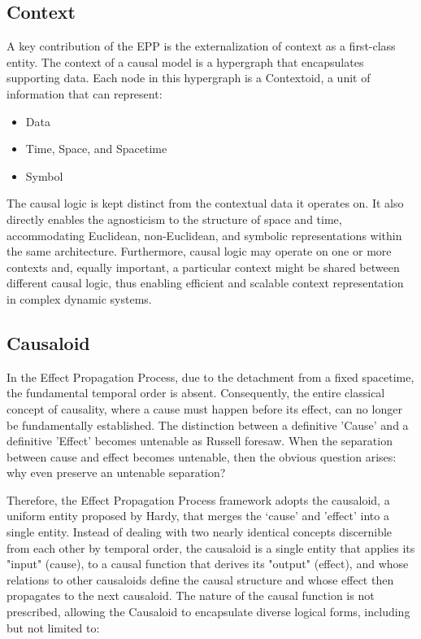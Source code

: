 %
%
\subsection{Context}
\label{sec:epp_context}

A key contribution of the EPP is the externalization of context as a first-class entity.
The context of a causal model is a hypergraph that encapsulates supporting data. 
Each node in this hypergraph is a Contextoid, a unit of information that can represent:

\begin{itemize}
	\item Data
	\item Time, Space, and Spacetime
	\item Symbol 
\end{itemize}

The causal logic is kept distinct from the contextual data it operates on. It also directly enables the  agnosticism to the structure of space and time, accommodating Euclidean, non-Euclidean, and symbolic representations within the same architecture. Furthermore,  causal logic  may operate on one or more contexts and, equally important, a particular context might be shared between different causal logic, thus enabling efficient and scalable context representation in complex dynamic systems. 

\newpage

%
%
\subsection{Causaloid}
\label{sec:epp_causaloid}

In the Effect Propagation Process, due to the detachment from a fixed spacetime, the fundamental temporal order is absent. Consequently, the entire classical concept of causality, where a cause must happen before its effect, can no longer be fundamentally established. The distinction between a definitive 'Cause' and a definitive 'Effect' becomes untenable as Russell foresaw. When the separation between cause and effect becomes untenable, then the obvious question arises: why even preserve an untenable separation?

Therefore, the Effect Propagation Process framework adopts the causaloid, a uniform entity proposed by Hardy\cite{HardyDynamicCausalStructure}, that merges the ‘cause' and 'effect' into a single entity. Instead of dealing with two nearly identical concepts discernible from each other by temporal order, the causaloid is a single entity that applies its "input" (cause), to a causal function that derives its "output" (effect), and whose relations to other causaloids define the causal structure and whose effect then propagates to the next causaloid. The nature of the causal function is not prescribed, allowing the Causaloid to encapsulate diverse logical forms, including but not limited to:

